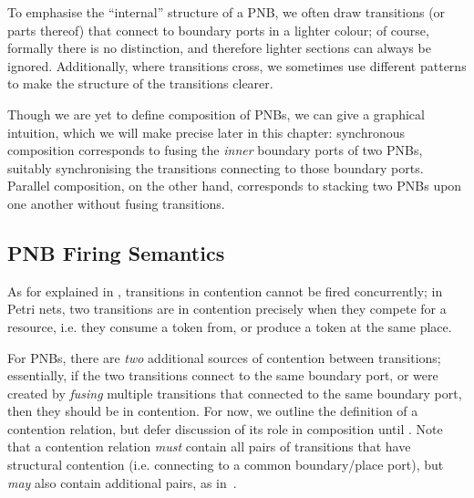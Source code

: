 To emphasise the ``internal'' structure of a PNB, we often draw transitions (or
parts thereof) that connect to boundary ports in a lighter colour; of course,
formally there is no distinction, and therefore lighter sections can always be
ignored. Additionally, where transitions cross, we sometimes use different
patterns to make the structure of the transitions clearer.

Though we are yet to define composition of PNBs, we can give a graphical
intuition, which we will make precise later in this chapter: synchronous
composition corresponds to fusing the \emph{inner} boundary ports of two PNBs,
suitably synchronising the transitions connecting to those boundary ports.
Parallel composition, on the other hand, corresponds to stacking two PNBs upon
one another without fusing transitions.

\subsection{PNB Firing Semantics}\label{sec:PNBfiring}

As for explained in , transitions in contention
cannot be fired concurrently; in Petri nets, two transitions are in contention
precisely when they compete for a resource, i.e. they consume a token from, or
produce a token at the same place.

For PNBs, there are \emph{two} additional sources of contention between transitions; essentially,
if the two transitions connect to the same boundary port, or were created by \emph{fusing} multiple
transitions that connected to the same boundary port, then they should be in contention.  For now,
we outline the definition of a contention relation, but defer discussion of its role in composition
until . Note that a contention relation \emph{must} contain all
pairs of transitions that have structural contention (i.e. connecting to a common boundary/place
port), but \emph{may} also contain additional pairs, as
in~.

